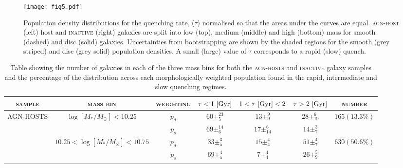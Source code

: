\documentclass[useAMS,usenatbib]{mn2e}
\def\secondchange    {\color{srv} }
\def\newref    {\color{new} }
\begin{document}
\begin{figure*}
\texttt{[image: fig5.pdf]}
\caption{{\secondchange Population density} distributions for the quenching rate, ($\tau$) normalised so that the areas under the curves are equal. \textsc{agn-host} (left) host and \textsc{inactive} (right) galaxies are split into low (top), medium (middle) and high (bottom) mass for smooth (dashed) and disc (solid) galaxies. {\newref Uncertainties from bootstrapping are shown by the shaded regions for the smooth (grey striped) and disc (grey solid) population densities.} A small (large) value of $\tau$ corresponds to a rapid (slow) quench.}
\label{rate}
\end{figure*}

\begin{table*}
\centering
\caption{Table showing the number of galaxies in each of the three mass bins for both the \textsc{agn-hosts} and \textsc{inactive} galaxy samples and the percentage of the {\secondchange distribution} across each morphologically weighted population found in the rapid, intermediate and slow quenching regimes.}
\label{massbins}
\begin{tabular}{c|c|c|c|c|c|c}
\hline
\textsc{sample}                     & \textsc{mass bin}                                        & \textsc{weighting}                  & $\tau < 1 ~\rm{[Gyr]}$                             & $1 < \tau ~\rm{[Gyr]} < 2 $          & $\tau > 2 ~\rm{[Gyr]}$                               & \textsc{number}                                        \\ \hline \hline
\multirow{6}{*}{AGN-HOSTS} & \multirow{2}{*}{$\log [M_*/M_{\odot}] < 10.25 $}                       & $p_d$     & $60\pm_{5}^{23}$                    & $13\pm_{9}^{9}$                    & $28\pm_{19}^{6}$       & \multirow{2}{*}{$165 (13.3\%)$}                      \\
                           &                                                 & $p_s$     & $69\pm_{6}^{14}$                    & $17\pm_{14}^{6}$                   & $14\pm_{7}^{3}$        &                                                      \\ \cline{2-7} 
                           & \multirow{2}{*}{$10.25 < \log [M_*/M_{\odot}] < 10.75$}                    & $p_d$     & $33\pm_{5}^{3}$                     & $15\pm_{4}^{4}$                    & $51\pm_{7}^{4}$        & \multirow{2}{*}{$630 (50.6\%)$}                      \\
                           &                                                 & $p_s$     & $69\pm_{5}^{4}$                     & $7\pm_{4}^{4}$                     & $26\pm_{9}^{5}$        &                                                      \\ \cline{2-7} 

\end{tabular}
\end{table*}
\end{document}
